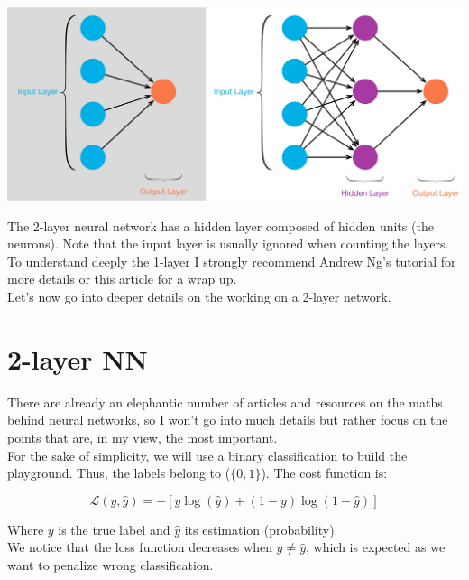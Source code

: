 \begin{center}
\includegraphics[scale=0.09]{img/nn-layers.jpeg}
\end{center}

The 2-layer neural network has a hidden layer composed of hidden units (the neurons). Note that the input layer is usually ignored when counting the layers. \\

To understand deeply the 1-layer I strongly recommend Andrew Ng's tutorial for more details or this \href{https://towardsdatascience.com/everything-you-need-to-know-about-neural-networks-and-backpropagation-machine-learning-made-easy-e5285bc2be3a}{article} for a wrap up. \\

Let's now go into deeper details on the working on a 2-layer network.

\section{2-layer NN}

There are already an elephantic number of articles and resources on the maths behind neural networks, so I won't go into much details but rather focus on the points that are, in my view, the most important. \\

For the sake of simplicity, we will use a binary classification to build the playground. Thus, the labels belong to ($\{0,1\}$). The cost function is:

$$\mathcal{L}(y, \widehat{y})=-[y\log(\widehat{y})+(1-y)\log(1-\widehat{y})]$$

Where $y$ is the true label and $\hat y$ its estimation (probability). \\

We notice that the loss function decreases when $y \neq \widehat y$, which is expected as we want to penalize wrong classification.

